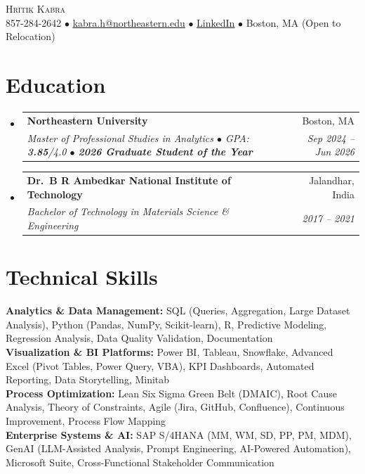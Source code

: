\documentclass[letterpaper,10pt]{article}
\makeatletter
\newcommand{\resumeSubheading}[4]{
  \vspace{1pt}\item
    \begin{tabular*}{0.97\textwidth}[t]{l@{\extracolsep{\fill}}r}
      \textbf{#1} & #2 \\
      \textit{\small#3} & \textit{\small #4} \\
    \end{tabular*}\vspace{-4pt}
}
\newcommand{\resumeSubHeadingListStart}{\begin{itemize}[leftmargin=0.15in, label={}]}
\newcommand{\resumeSubHeadingListEnd}{\end{itemize}}
\makeatother
\begin{document}
\begin{center}
    {\Huge \scshape \color{heading} Hritik Kabra} \\ \vspace{2pt}
    \small 857-284-2642 $\bullet$
    \href{mailto:kabra.h@northeastern.edu}{\underline{kabra.h@northeastern.edu}} $\bullet$
    \href{https://www.linkedin.com/in/hritikkabra888}{\underline{LinkedIn}} $\bullet$
    Boston, MA (Open to Relocation)
\end{center}
\section{Education}
\resumeSubHeadingListStart
\resumeSubheading
{Northeastern University}{Boston, MA}
{Master of Professional Studies in Analytics $\bullet$ GPA: \textbf{3.85}/4.0 $\bullet$ \textbf{2026 Graduate Student of the Year}}{Sep 2024 -- Jun 2026}
\resumeSubheading
{Dr.\ B R Ambedkar National Institute of Technology}{Jalandhar, India}
{Bachelor of Technology in Materials Science \& Engineering}{2017 -- 2021}
\resumeSubHeadingListEnd
\section{Technical Skills}
\begin{itemize}[leftmargin=0.15in, label={}]
\small{\item{
\textbf{Analytics \& Data Management:} SQL (Queries, Aggregation, Large Dataset Analysis), Python (Pandas, NumPy, Scikit-learn), R, Predictive Modeling, Regression Analysis, Data Quality Validation, Documentation \\
\textbf{Visualization \& BI Platforms:} Power BI, Tableau, Snowflake, Advanced Excel (Pivot Tables, Power Query, VBA), KPI Dashboards, Automated Reporting, Data Storytelling, Minitab \\
\textbf{Process Optimization:} Lean Six Sigma Green Belt (DMAIC), Root Cause Analysis, Theory of Constraints, Agile (Jira, GitHub, Confluence), Continuous Improvement, Process Flow Mapping \\
\textbf{Enterprise Systems \& AI:} SAP S/4HANA (MM, WM, SD, PP, PM, MDM), GenAI (LLM-Assisted Analysis, Prompt Engineering, AI-Powered Automation), Microsoft Suite, Cross-Functional Stakeholder Communication
}}
\end{itemize}
\end{document}
